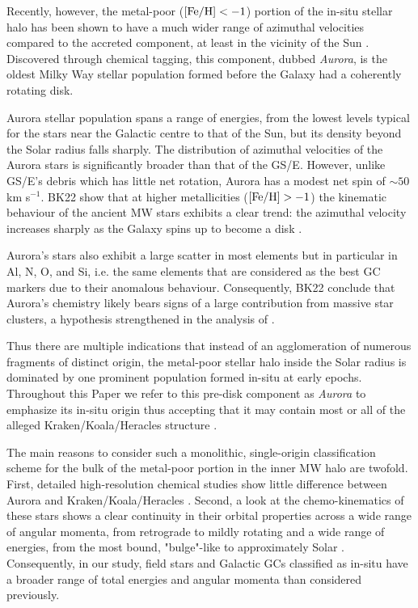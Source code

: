 \documentclass[a4paper,useAMS,usenatbib]{mnras}
\begin{document}
Recently, however, the metal-poor ($\rm [Fe/H]<-1$) portion of the in-situ stellar halo has been shown to have a much wider range of azimuthal velocities compared to the accreted component, at least in the vicinity of the Sun \citep[][hereafter BK22]{Aurora}. 
Discovered through chemical tagging, this component, dubbed {\it Aurora}, is the oldest Milky Way stellar population formed before the Galaxy had a coherently rotating disk.  

Aurora stellar population spans a range of energies, from the lowest levels typical for the stars near the Galactic centre to that of the Sun, but its density beyond the Solar radius falls sharply. The distribution of azimuthal velocities of the Aurora stars is significantly broader than that of the GS/E. However, unlike GS/E's debris which has little net rotation, Aurora has a modest net spin of $\sim50$ km s$^{-1}$. BK22 show that at higher metallicities ($\rm [Fe/H]>-1$) the kinematic behaviour of the ancient MW stars exhibits a clear trend: the azimuthal velocity increases sharply as the Galaxy spins up to become a disk \citep[see also][]{Conroy2022,Rix2022}. 

Aurora's stars also exhibit a large scatter in most elements but in particular in Al, N, O, and Si, i.e. the same elements that are considered as the best GC markers due to their anomalous behaviour. Consequently, BK22 conclude that Aurora's chemistry likely bears signs of a large contribution from massive star clusters, a hypothesis strengthened in the analysis of \citet{Myeong2022}.

Thus there are multiple indications that instead of an agglomeration of numerous fragments of distinct origin, the metal-poor stellar halo inside the Solar radius is dominated by one prominent population formed in-situ at early epochs. Throughout this Paper we refer to this pre-disk component as {\it Aurora} to emphasize its in-situ origin thus accepting that it may contain most or all of the alleged Kraken/Koala/Heracles structure \citep[][]{Krujssen2019,Horta_heracles,Forbes2020}. 

The main reasons to consider such a monolithic, single-origin classification scheme for the bulk of the metal-poor portion in the inner MW halo are twofold. First, detailed high-resolution chemical studies show little difference between Aurora and Kraken/Koala/Heracles \citep[][]{Aurora,Naidu2022,Myeong2022,Horta2023}. Second, a look at the chemo-kinematics of these stars shows a clear continuity in their orbital properties across a wide range of angular momenta, from retrograde to mildly rotating and a wide range of energies, from the most bound, "bulge"-like to approximately Solar \citep[][]{PIGS_I,PIGS_II,Aurora,Conroy2022,Myeong2022,Rix2022}. Consequently, in our study, field stars and Galactic GCs  classified as in-situ have a broader range of total energies and angular momenta than considered previously.
\end{document}
